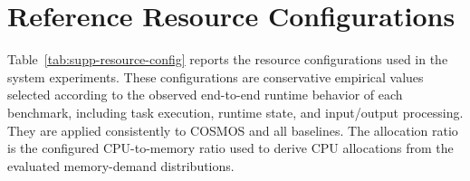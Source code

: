 \section{Reference Resource Configurations}
\label{app:resource-configurations}

Table~\ref{tab:supp-resource-config} reports the resource configurations used
in the system experiments. These configurations are conservative empirical
values selected according to the observed end-to-end runtime behavior of each
benchmark, including task execution, runtime state, and input/output processing.
They are applied consistently to COSMOS and all baselines. The allocation ratio
is the configured CPU-to-memory ratio used to derive CPU allocations from the
evaluated memory-demand distributions.

\providecommand{\resourceconfigtablebegin}{\begin{table}[t]}
\resourceconfigtablebegin
    \caption{Resource configurations used in the system experiments.}
    \label{tab:supp-resource-config}
    \centering
    \small
    \setlength{\tabcolsep}{4pt}
\end{table}
